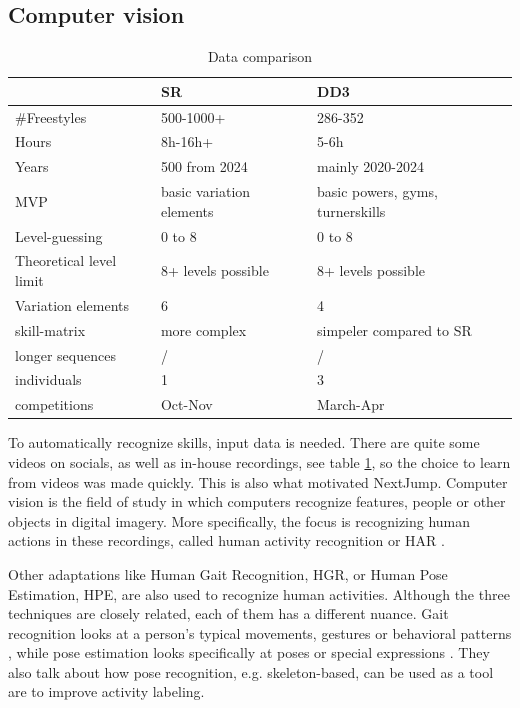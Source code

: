 \subsection{Computer vision}
\label{subsec:literature-computer-vision}

\begin{table}[t]
    \centering
    \begin{tabular}{|l|l|l|}
        \hline
        & SR & DD3 \\ \hline
        \#Freestyles & 500-1000+ & 286-352 \\ \hline
        Hours & 8h-16h+ & 5-6h \\ \hline
        Years & 500 from 2024 & mainly 2020-2024 \\ \hline
        MVP & basic variation elements & basic powers, gyms, turnerskills \\ \hline
        Level-guessing & 0 to 8 & 0 to 8 \\ \hline
        Theoretical level limit & 8+ levels possible & 8+ levels possible \\ \hline
        Variation elements & 6 & 4 \\ \hline
        skill-matrix & more complex & simpeler compared to SR \\ \hline
        longer sequences & / & / \\ \hline
        individuals & 1 & 3 \\ \hline
        competitions & Oct-Nov & March-Apr \\ \hline
    \end{tabular}
    \caption{Data comparison}
    \label{tbl:data-comparison}
\end{table}

To automatically recognize skills, input data is needed. There are quite some videos on socials, as well as in-house recordings, see table \ref{tbl:data-comparison}, so the choice to learn from videos was made quickly. This is also what motivated NextJump.
Computer vision is the field of study in which computers recognize features, people or other objects in digital imagery. More specifically, the focus is recognizing human actions in these recordings, called human activity recognition or HAR \autocite{Pareek_2020}.

Other adaptations like Human Gait Recognition, HGR, or Human Pose Estimation, HPE, are also used to recognize human activities. Although the three techniques are closely related, each of them has a different nuance. Gait recognition looks at a person's typical movements, gestures or behavioral patterns \autocite{Alharthi_2019}, while pose estimation looks specifically at poses or special expressions \autocite{Song_2021}. They also talk about how pose recognition, e.g. skeleton-based, can be used as a tool are to improve activity labeling.


